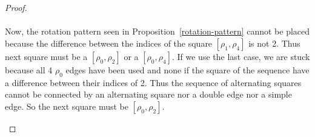\begin{proof}
\begin{figure}[H]
\begin{center}
      \caption{}
    \end{center}
  \end{figure}

  \paragraph{}
  Now, the rotation pattern seen in Proposition~\ref{rotation-pattern} cannot be placed because the difference between the indices of the square $[\rho_1, \rho_4]$ is not 2. Thus next square must be a $[\rho_0, \rho_2]$ or a $[\rho_0, \rho_4]$. If we use the last case, we are stuck because all 4 $\rho_0$ edges have been used and none if the square of the sequence have a difference between their indices of 2. Thus the sequence of alternating squares cannot be connected by an alternating square nor a double edge nor a simple edge. So the next square must be $[\rho_0, \rho_2]$.

  \begin{figure}[H]
    \begin{center}
\end{center}
\end{figure}
\end{proof}
